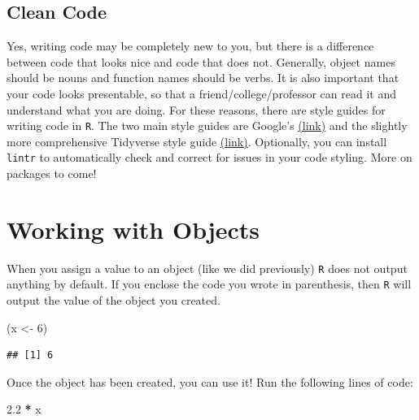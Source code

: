 \documentclass[]{article}
\newenvironment{Shaded}{\begin{snugshade}}{\end{snugshade}}
\newcommand{\DecValTok}[1]{\textcolor[rgb]{0.00,0.00,0.81}{#1}}
\newcommand{\FloatTok}[1]{\textcolor[rgb]{0.00,0.00,0.81}{#1}}
\newcommand{\StringTok}[1]{\textcolor[rgb]{0.31,0.60,0.02}{#1}}
\newcommand{\OperatorTok}[1]{\textcolor[rgb]{0.81,0.36,0.00}{\textbf{#1}}}
\newcommand{\NormalTok}[1]{#1}
\begin{document}
\subsection{Clean Code}\label{clean-code}

Yes, writing code may be completely new to you, but there is a
difference between code that looks nice and code that does not.
Generally, object names should be nouns and function names should be
verbs. It is also important that your code looks presentable, so that a
friend/college/professor can read it and understand what you are doing.
For these reasons, there are style guides for writing code in
\texttt{R}. The two main style guides are Google's
\href{https://google.github.io/styleguide/Rguide.xml}{(link)} and the
slightly more comprehensive Tidyverse style guide
\href{https://style.tidyverse.org/}{(link)}. Optionally, you can install
\texttt{lintr} to automatically check and correct for issues in your
code styling. More on packages to come!

\section{Working with Objects}\label{working-with-objects}

When you assign a value to an object (like we did previously) \texttt{R}
does not output anything by default. If you enclose the code you wrote
in parenthesis, then \texttt{R} will output the value of the object you
created.

\vspace{0.25cm}

\begin{Shaded}
\begin{Highlighting}[]
\NormalTok{(x <-}\StringTok{ }\DecValTok{6}\NormalTok{)}
\end{Highlighting}
\end{Shaded}

\begin{verbatim}
## [1] 6
\end{verbatim}

\vspace{0.25cm}

Once the object has been created, you can use it! Run the following
lines of code:

\vspace{0.25cm}

\begin{Shaded}
\begin{Highlighting}[]
\FloatTok{2.2} \OperatorTok{*}\StringTok{ }\NormalTok{x}
\end{Highlighting}
\end{Shaded}
\end{document}
